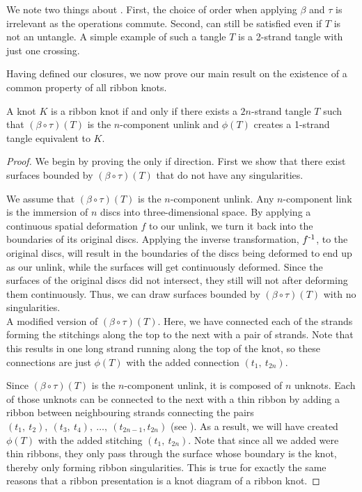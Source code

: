 \begin{paper}
We note two things about \eqUnlink.
First, the choice of order when applying $\beta$ and $\tau$ is irrelevant as the
operations commute.
Second, \eqUnlink can still be satisfied even if $T$ is not an untangle.
A simple example of such a tangle $T$ is a 2-strand tangle with just one
crossing.

Having defined our closures, we now prove our main result on the existence of a
common property of all ribbon knots.

{A knot $K$ is a ribbon knot if and only if there exists a $2n$-strand tangle
$T$ such that $(\beta\circ\tau)(T)$ is the $n$-component unlink and $\phi(T)$
creates a 1-strand tangle equivalent to $K$.}
\begin{proof}
We begin by proving the only if direction.
First we show that there exist surfaces bounded by $(\beta\circ\tau)(T)$ that do
not have any singularities.

We assume that $(\beta\circ\tau)(T)$ is the $n$-component unlink.
Any $n$-component link is the immersion of $n$ discs into three-dimensional
space.
By applying a continuous spatial deformation $f$ to our unlink, we turn it back
into the boundaries of its original discs.
Applying the inverse transformation, $f^{\text-1}$, to the original discs, will
result in the boundaries of the discs being deformed to end up as our unlink,
while the surfaces will get continuously deformed.
Since the surfaces of the original discs did not intersect, they still will not
after deforming them continuously.
Thus, we can draw surfaces bounded by $(\beta\circ\tau)(T)$ with no
singularities.\\

{A modified version of $(\beta\circ\tau)(T)$.
Here, we have connected each of the strands forming the stitchings along the top
to the next with a pair of strands.
Note that this results in one long strand running along the top of the knot, so
these connections are just $\phi(T)$ with the added connection $(t_1,~t_{2n})$.}

Since $(\beta\circ\tau)(T)$ is the $n$-component unlink, it is composed of $n$
unknots.
Each of those unknots can be connected to the next with a thin ribbon by adding
a ribbon between neighbouring strands connecting the pairs
$(t_1,~t_2),~(t_3,~t_4),~\dots,~(t_{2n-1},t_{2n})$ (see \figProof).
As a result, we will have created $\phi(T)$ with the added stitching
$(t_1,~t_{2n})$.
Note that since all we added were thin ribbons, they only pass through the
surface whose boundary is the knot, thereby only forming ribbon singularities.
This is true for exactly the same reasons that a ribbon presentation is a knot
diagram of a ribbon knot.


\end{proof}
\end{paper}
